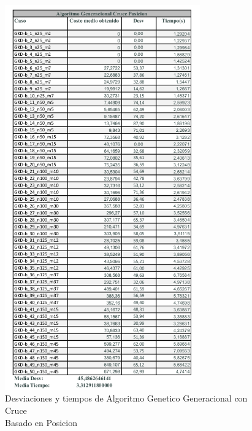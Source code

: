\documentclass{article}
\begin{document}
\begin{figure}[t]
  \centering
  \includegraphics[width=0.75\textwidth]{capturastablas/AGG-Posicion.png}
  \caption{Desviaciones y tiempos de Algoritmo Genetico Generacional con Cruce \\
  Basado en Posicion}
\end{figure}
\end{document}
